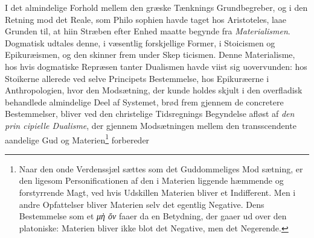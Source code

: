 \documentclass[12pt,a4paper]{book}
\newcommand{\divrule}{\begin{center}\rule{2cm}{0.4pt}\end{center}}
\newcommand{\gk}[1]{\textit{#1}}
\begin{document}
I det almindelige Forhold mellem den græske Tænknings
Grundbegreber, og i den Retning mod det Reale, som Philo\-%
sophien havde taget hos Aristoteles, laae Grunden til, at hiin
Stræben efter Enhed maatte begynde fra \emph{Materialismen}.
Dogmatisk udtales denne, i væsentlig forskjellige Former, i
Stoicismen og Epikuræismen, og den skinner frem under Skep\-%
ticismen. Denne Materialisme, hos hvis dogmatiske Repræsen\-%
tanter Dualismen havde viist sig uovervunden: hos Stoikerne
allerede ved selve Principets Bestemmelse, hos Epikuræerne i
Anthropologien, hvor den Modsætning, der kunde holdes skjult
i den overfladisk behandlede almindelige Deel af Systemet,
brød frem gjennem de concretere Bestemmelser, bliver ved
den christelige Tidsregnings Begyndelse afløst af \emph{den prin\-%
cipielle Dualisme}, der gjennem Modsætningen mellem
%
den transscendente aandelige Gud og Materien\footnote{Naar den onde Verdenssjæl sættes som det Guddommeliges Mod\-%
sætning, er den ligesom Personificationen af den i Materien liggende
hæmmende og forstyrrende Magt, ved hvis Udskillen Materien bliver
et Indifferent. Men i andre Opfattelser bliver Materien selv det
egentlig Negative. Dens Bestemmelse som et \gk{μὴ ὄν} faaer da en
Betydning, der gaaer ud over den platoniske: Materien bliver ikke
blot det Negative, men det Negerende.} forbereder
\end{document}
